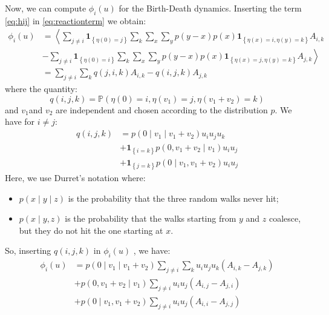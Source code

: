 Now, we can compute $\phi_{i}\left(u\right)$ for the Birth-Death
dynamics. Inserting the term \ref{eq:hij} in \ref{eq:reactionterm}
we obtain:
\begin{align*}
\phi_{i}\left(u\right) & =\left\langle \sum_{j\neq i}\mathbf{1}_{\left\{ \eta\left(0\right)=j\right\} }\sum_{k}\sum_{x}\sum_{y}p\left(y-x\right)p\left(x\right)\mathbf{1}_{\left\{ \eta\left(x\right)=i,\eta\left(y\right)=k\right\} }A_{i,k}\right.\\
 & -\left.\sum_{j\neq i}\mathbf{1}_{\left\{ \eta\left(0\right)=i\right\} }\sum_{k}\sum_{x}\sum_{y}p\left(y-x\right)p\left(x\right)\mathbf{1}_{\left\{ \eta\left(x\right)=j,\eta\left(y\right)=k\right\} }A_{j,k}\right\rangle \\
 & =\sum_{j\neq i}\sum_{k}q\left(j,i,k\right)A_{i,k}-q\left(i,j,k\right)A_{j,k}
\end{align*}
where the quantity: 
\[
q\left(i,j,k\right)=\mathbb{P}\left(\eta\left(0\right)=i,\eta\left(v_{1}\right)=j,\eta\left(v_{1}+v_{2}\right)=k\right)
\]
and $v_{1}$and $v_{2}$ are independent and chosen according to the
distribution $p$. We have for $i\neq j$:
\begin{align*}
q\left(i,j,k\right) & =p\left(0\mid v_{1}\mid v_{1}+v_{2}\right)u_{i}u_{j}u_{k}\\
 & +\mathbf{\mathbf{1}}_{\left\{ i=k\right\} }p\left(0,v_{1}+v_{2}\mid v_{1}\right)u_{i}u_{j}\\
 & +\mathbf{\mathbf{1}}_{\left\{ j=k\right\} }p\left(0\mid v_{1},v_{1}+v_{2}\right)u_{i}u_{j}
\end{align*}
 Here, we use Durret's notation where:
\begin{itemize}
\item $p\left(x\mid y\mid z\right)$ is the probability that the three random
walks never hit;
\item $p\left(x\mid y,z\right)$ is the probability that the walks starting
from $y$ and $z$ coalesce, but they do not hit the one starting
at $x$. 
\end{itemize}
So, inserting $q\left(i,j,k\right)$ in $\phi_{i}\left(u\right)$
, we have:
\begin{align*}
\phi_{i}\left(u\right) & =p\left(0\mid v_{1}\mid v_{1}+v_{2}\right)\sum_{j\neq i}\sum_{k}u_{i}u_{j}u_{k}\left(A_{i,k}-A_{j,k}\right)\\
 & +p\left(0,v_{1}+v_{2}\mid v_{1}\right)\sum_{j\neq i}u_{i}u_{j}\left(A_{i,j}-A_{j,i}\right)\\
 & +p\left(0\mid v_{1},v_{1}+v_{2}\right)\sum_{j\neq i}u_{i}u_{j}\left(A_{i,i}-A_{j,j}\right)
\end{align*}

